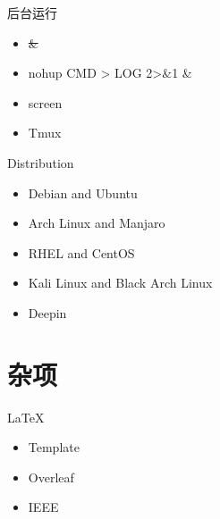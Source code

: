\documentclass{beamer}
\begin{document}
\begin{frame}{后台运行}
    \begin{itemize}
        \item \sout{\&}
        \item nohup CMD > LOG 2>\&1 \&
        \item screen
        \item Tmux
    \end{itemize}
\end{frame}

\begin{frame}{Distribution}
    \begin{itemize}
        \item Debian and Ubuntu
        \item Arch Linux and Manjaro
        \item RHEL and CentOS
        \item Kali Linux and Black Arch Linux
        \item Deepin
    \end{itemize}
\end{frame}




\section{杂项}


\begin{frame}{LaTeX}
    \begin{itemize}
        \item Template
        \item Overleaf
        \item IEEE
    \end{itemize}
\end{frame}
\end{document}
